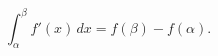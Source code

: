\documentclass{article}
\begin{document}
\begin{equation}
	\int_\alpha^\beta f'(x) \, dx=f(\beta)-f(\alpha).
\end{equation}
\end{document}
